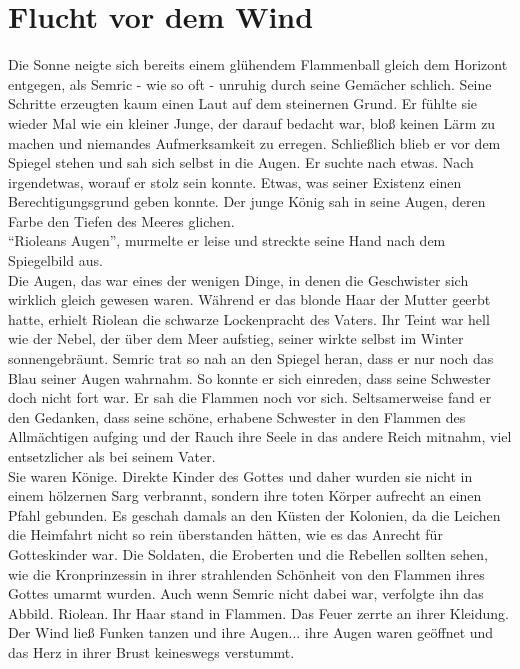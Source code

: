 \chapter{Flucht vor dem Wind}

Die Sonne neigte sich bereits einem glühendem Flammenball gleich dem Horizont 
entgegen, als Semric - wie so oft - unruhig durch seine Gemächer schlich. Seine Schritte erzeugten 
kaum einen Laut auf dem steinernen Grund. Er fühlte sie wieder Mal wie ein kleiner Junge, der 
darauf bedacht war, bloß keinen Lärm zu machen und niemandes Aufmerksamkeit zu erregen. Schließlich 
blieb er vor dem Spiegel stehen und sah sich selbst in die Augen. Er suchte nach etwas. Nach 
irgendetwas, worauf er stolz sein konnte. Etwas, was seiner Existenz einen Berechtigungsgrund geben 
konnte. Der junge König sah in seine Augen, deren Farbe den Tiefen des Meeres glichen.\\
``Rioleans Augen'', murmelte er leise und streckte seine Hand nach dem Spiegelbild aus. \\
Die Augen, das war eines der wenigen Dinge, in denen die Geschwister sich wirklich gleich gewesen 
waren. Während er das blonde Haar der Mutter geerbt hatte, erhielt Riolean die schwarze Lockenpracht 
des Vaters. Ihr Teint war hell wie der Nebel, der über dem Meer aufstieg, seiner wirkte selbst im 
Winter sonnengebräunt. Semric trat so nah an den Spiegel heran, dass er nur noch das Blau seiner 
Augen wahrnahm. So konnte er sich einreden, dass seine Schwester doch nicht fort war. Er sah die 
Flammen noch vor sich. Seltsamerweise fand er den Gedanken, dass seine schöne, erhabene Schwester in 
den Flammen des Allmächtigen aufging und der Rauch ihre Seele in das andere Reich mitnahm, viel 
entsetzlicher als bei seinem Vater.\\
Sie waren Könige. Direkte Kinder des Gottes und daher wurden sie nicht in einem hölzernen Sarg 
verbrannt, sondern ihre toten Körper aufrecht an einen Pfahl gebunden. Es geschah damals an den 
Küsten der Kolonien, da die Leichen die Heimfahrt nicht so rein überstanden hätten, wie es das 
Anrecht für Gotteskinder war. Die Soldaten, die Eroberten und die Rebellen sollten sehen, wie die 
Kronprinzessin in ihrer strahlenden Schönheit von den Flammen ihres Gottes umarmt wurden. Auch wenn 
Semric nicht dabei war, verfolgte ihn das Abbild. Riolean. Ihr Haar stand in Flammen. Das Feuer 
zerrte an ihrer Kleidung. Der Wind ließ Funken tanzen und ihre Augen... ihre Augen waren geöffnet 
und das Herz in ihrer Brust keineswegs verstummt. \\
